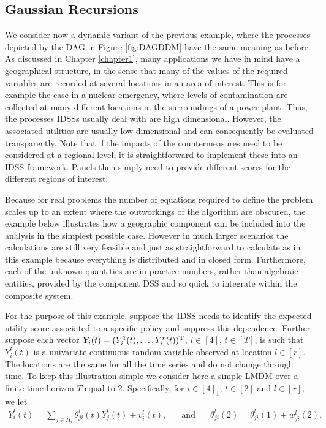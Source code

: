 \subsection{Gaussian Recursions}
We consider now a dynamic variant of the previous example, where the processes depicted by the DAG in Figure \ref{fig:DAGDDM} have the same meaning as before. As discussed in Chapter \ref{chapter1}, many applications we have in mind  have a geographical structure, in the sense that many of the values of the required variables are recorded at several locations in an area of interest. This is for example the case in a nuclear emergency, where levels of contamination are collected at many different locations in the surroundings of a power plant. Thus, the processes IDSSs usually  deal with are high dimensional. However, the associated utilities are usually low dimensional and can consequently be evaluated transparently. Note that if the impacts of the countermeasures need to be considered at a regional level, it is straightforward to implement these into an IDSS framework. Panels then simply need to provide different scores for the different regions of interest.  

Because for real problems the number of equations required to define the problem scales up to an extent where the outworkings of the algorithm are obscured, the example below illustrates how a  geographic component can be included into the analysis in the simplest possible case. However in much larger scenarios the calculations are still very feasible and just as straightforward to calculate as in this example because everything is distributed and in closed form. Furthermore, each of the unknown quantities are in practice numbers, rather than algebraic entities, provided by the component DSS and so quick to integrate within the composite system.

For the purpose of this example, suppose the IDSS needs to identify the expected utility score associated to a specific policy and suppress this dependence. Further suppose each vector $\bm{Y}_i(t)=(Y_i^1(t),\dots, Y_i^r(t))^{\textnormal{T}}$, $i\in[4]$, $t\in [T]$, is such that $Y_i^l(t)$ is a univariate continuous random variable observed at location $l\in [r]$. The locations are the same for all the time series and do not change through time. To keep this illustration simple  we  consider here a simple LMDM over a finite time horizon $T$ equal to $2$. Specifically, for  $i\in[4]_1$, $t\in[2]$ and  $l\in[r]$, we let
\begin{eqnarray}
Y^l_i(t)=\sum_{j\in \Pi_i}\theta_{ji}^l(t)Y_j^l(t)+v_i^l(t), \;\;\;\;\; \mbox{ and }\;\;\;\;\;
\theta^l_{ji}(2)=\theta^l_{ji}(1)+w^l_{ji}(2)\label{lmdm1}.
\end{eqnarray}

